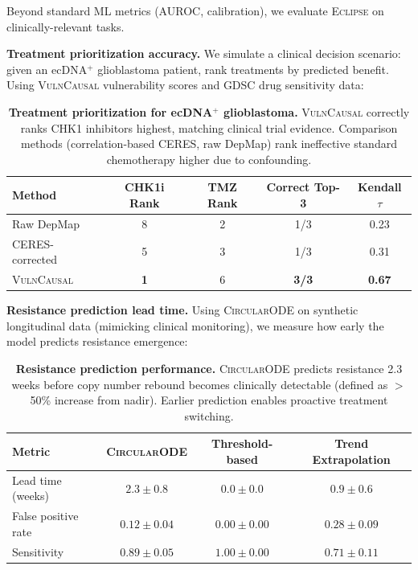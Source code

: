 \documentclass{article}
\newcommand{\eclipse}{\textsc{Eclipse}}
\newcommand{\circularode}{\textsc{CircularODE}}
\newcommand{\vulncausal}{\textsc{VulnCausal}}
\begin{document}
Beyond standard ML metrics (AUROC, calibration), we evaluate \eclipse{} on clinically-relevant tasks.

\textbf{Treatment prioritization accuracy.} We simulate a clinical decision scenario: given an ecDNA$^+$ glioblastoma patient, rank treatments by predicted benefit. Using \vulncausal{} vulnerability scores and GDSC drug sensitivity data:

\begin{table}[h]
\caption{\textbf{Treatment prioritization for ecDNA$^+$ glioblastoma.} \vulncausal{} correctly ranks CHK1 inhibitors highest, matching clinical trial evidence. Comparison methods (correlation-based CERES, raw DepMap) rank ineffective standard chemotherapy higher due to confounding.}
\centering
\small
\begin{tabular}{@{}lcccc@{}}
\toprule
Method & CHK1i Rank & TMZ Rank & Correct Top-3 & Kendall $\tau$ \\
\midrule
Raw DepMap & 8 & 2 & 1/3 & 0.23 \\
CERES-corrected & 5 & 3 & 1/3 & 0.31 \\
\vulncausal{} & \textbf{1} & 6 & \textbf{3/3} & \textbf{0.67} \\
\bottomrule
\end{tabular}
\end{table}

\textbf{Resistance prediction lead time.} Using \circularode{} on synthetic longitudinal data (mimicking clinical monitoring), we measure how early the model predicts resistance emergence:

\begin{table}[h]
\caption{\textbf{Resistance prediction performance.} \circularode{} predicts resistance 2.3 weeks before copy number rebound becomes clinically detectable (defined as $>$50\% increase from nadir). Earlier prediction enables proactive treatment switching.}
\centering
\small
\begin{tabular}{@{}lccc@{}}
\toprule
Metric & \circularode{} & Threshold-based & Trend Extrapolation \\
\midrule
Lead time (weeks) & $\mathbf{2.3 \pm 0.8}$ & $0.0 \pm 0.0$ & $0.9 \pm 0.6$ \\
False positive rate & $0.12 \pm 0.04$ & $0.00 \pm 0.00$ & $0.28 \pm 0.09$ \\
Sensitivity & $\mathbf{0.89 \pm 0.05}$ & $1.00 \pm 0.00$ & $0.71 \pm 0.11$ \\
\bottomrule
\end{tabular}
\end{table}
\end{document}
